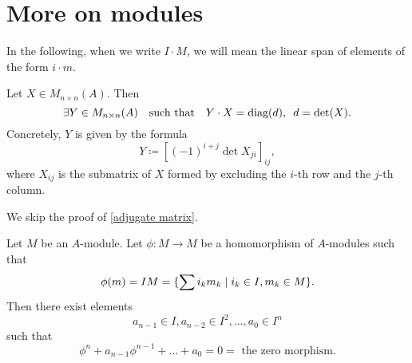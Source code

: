 \section{More on modules}
\begin{note}
  In the following, when we write $I \cdot M$, we will mean the linear span of elements of the form $i \cdot m$.
\end{note}

\begin{lemma}
  \label{adjugate matrix}
  Let
  $X \in M_{n \times n}(A)$.
  Then
  \[ \exists Y \in M_{n \times n}(A) \quad \text{such that} \quad Y \cdot X = \text{diag}(d), \enspace d = \det(X).\]
  Concretely,
  $Y$ is given by the formula
  \[ Y \coloneqq [ (-1)^{i+j} \det X_{ji} ]_{ij}, \]
  where
  $X_{ij}$ is the submatrix of $X$ formed by excluding the $i$-th row and the $j$-th column.
\end{lemma}

We skip the proof of \cref{adjugate matrix}.

\begin{theorem}
  Let $M$ be an $A$-module. Let $\phi: M \to M$ be a homomorphism of $A$-modules such that
  \[ \phi(m) = IM = \{ \sum i_k m_k \mathrel{|} i_k \in I, m_k \in M \}. \]
  Then there exist elements
  \[ a_{n-1} \in I, a_{n-2} \in I^2, \ldots, a_0 \in I^n \]
  such that
  \[ \phi^n + a_{n-1} \phi^{n-1} + \ldots + a_0 = 0 = \text{ the zero morphism}. \]
\end{theorem}

